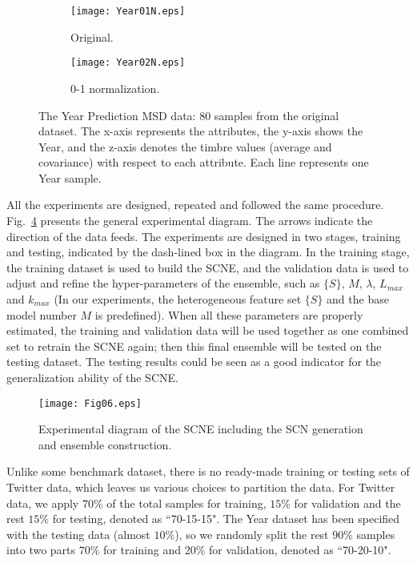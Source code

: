 \documentclass{article}
\begin{document}
\begin{figure}[!h]
\centering
    \begin{subfigure}[b]{0.49\textwidth}
        \texttt{[image: Year01N.eps]}
        \caption{Original.}
        \label{Fig06a: Year_Original}    
    \end{subfigure}    
    \begin{subfigure}[b]{0.49\textwidth}
    \texttt{[image: Year02N.eps]}
    \caption{0-1 normalization.}
    \label{Fig06: Year_Zscore}    
    \end{subfigure}    
\caption{The Year Prediction MSD data:  80 samples from the original dataset. The x-axis represents the attributes, the y-axis shows the Year, and the z-axis denotes the timbre values (average and covariance) with respect to each attribute. Each line represents one Year sample.}
\label{Fig6_Year_Data}
\end{figure} 

All the experiments are designed, repeated and followed the same procedure. 
Fig.~\ref{Fig7_ExperimentalDiagram} presents the general experimental diagram. 
The arrows indicate the direction of the data feeds.
The experiments are designed in two stages, training and testing, indicated by the dash-lined box in the diagram.
In the training stage, the training dataset is used to build the SCNE, and the validation data is used to adjust and refine the hyper-parameters of the ensemble, such as $\{S\}$, $M$, $\lambda$, $L_{max}$ and $k_{max}$ (In our experiments, the heterogeneous feature set $\{S\}$ and the base model number $M$ is predefined). 
When all these parameters are properly estimated, the training and validation data will be used together as one combined set to retrain the SCNE again; then this final ensemble will be tested on the testing dataset.
The testing results could be seen as a good indicator for the generalization ability of the SCNE.
\begin{figure}[h]
\centering
\texttt{[image: Fig06.eps]}
\caption{ Experimental diagram of the SCNE including the SCN generation and ensemble construction.}
\label{Fig7_ExperimentalDiagram}
\end{figure}
Unlike some benchmark dataset, there is no ready-made training or testing sets of Twitter data, which leaves us various choices to partition the data.
For Twitter data, we apply $70\%$ of the total samples for training, $15\%$ for validation and the rest $15\%$ for testing, denoted as ``70-15-15".
The Year dataset has been specified with the testing data (almost $10\%$), so we randomly split the rest $90\%$ samples into two parts $70\%$ for training and $20\%$ for validation, denoted as ``70-20-10". 
\end{document}
